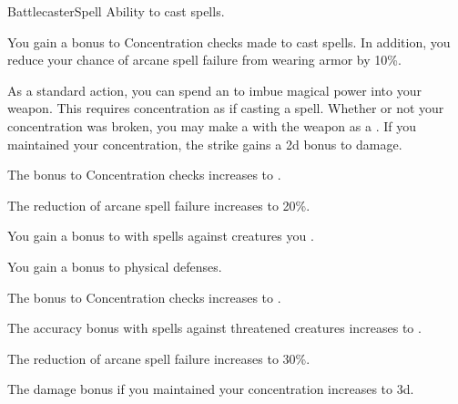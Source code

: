     \begin{feat}{Battlecaster}{Spell}
        \featpre Ability to cast spells.
        \featben

         You gain a  bonus to Concentration checks made to cast spells.
        In addition, you reduce your chance of arcane spell failure from wearing armor by 10\%.

         As a standard action, you can spend an  to imbue magical power into your weapon.
        This requires concentration as if casting a spell.
        Whether or not your concentration was broken, you may make a  with the weapon as a .
        If you maintained your concentration, the strike gains a \plus2d bonus to damage.

         The bonus to Concentration checks increases to .

         The reduction of arcane spell failure increases to 20\%.

         You gain a  bonus to  with spells against creatures you .

         You gain a  bonus to physical defenses.

         The bonus to Concentration checks increases to .

         The accuracy bonus with spells against threatened creatures increases to .

         The reduction of arcane spell failure increases to 30\%. 

         The damage bonus if you maintained your concentration increases to \plus3d.
    \end{feat}

